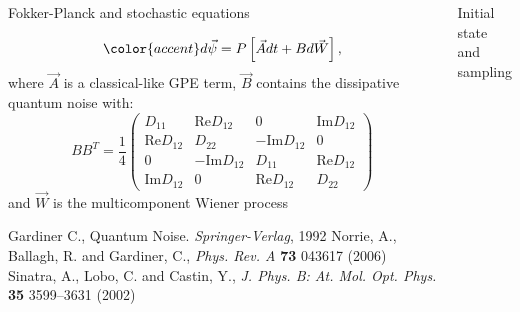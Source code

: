 \documentclass[final,hyperref={pdfpagelabels=false}]{beamer}
\begin{document}
\begin{frame}
\begin{columns}
{\begin{block}{Fokker-Planck and stochastic equations}
\begin{itemize}
\[\color{accent} d \vec{\psi} = P \left[ \vec{A} dt + B d\vec{W} \right], \]
where $\vec{A}$ is a classical-like GPE term,  $\vec{B}$ contains the dissipative quantum noise with:
\[
\newcommand{\ta}{D_{11}}
\newcommand{\tb}{\textrm{Re}D_{12}}
\newcommand{\tc}{\textrm{Im}D_{12}}
\newcommand{\td}{D_{22}}
B B^T = \frac{1}{4} \begin{pmatrix}
\ta & \tb & 0 & \tc \\
\tb & \td & -\tc & 0 \\
0 & -\tc & \ta & \tb \\
\tc & 0 & \tb & \td
\end{pmatrix}
\]
and $\vec{W}$ is the multicomponent Wiener process
\end{itemize}

\tiny{ \begin{thebibliography}{9}
	 Gardiner C., Quantum Noise. \textit{Springer-Verlag}, 1992
	 Norrie, A., Ballagh, R. and Gardiner, C., \textit{Phys. Rev. A} \textbf{73} 043617 (2006)
	 Sinatra, A., Lobo, C. and Castin, Y., \textit{J. Phys. B: At. Mol. Opt. Phys.} \textbf{35} 3599--3631 (2002)
\end{thebibliography} }

\end{block}

\begin{block}{Initial state and sampling}


\end{block}}
\end{columns}
\end{frame}
\end{document}
